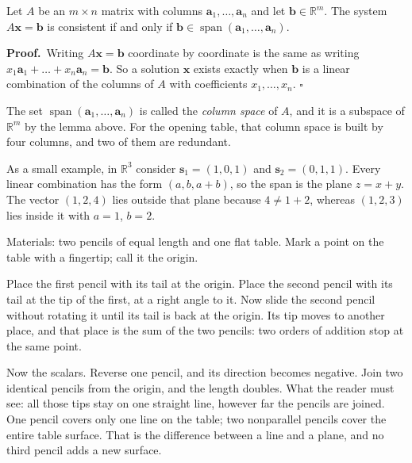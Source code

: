 \begin{proposisi}
Let $A$ be an $m\times n$ matrix with columns $\mathbf{a}_{1},\dots,\mathbf{a}_{n}$ and let
$\mathbf{b}\in\mathbb{R}^{m}$. The system $A\mathbf{x}=\mathbf{b}$ is consistent if and only if
$\mathbf{b}\in\operatorname{span}(\mathbf{a}_{1},\dots,\mathbf{a}_{n})$.
\end{proposisi}

\par\medskip\noindent\textbf{Proof.}\ 
Writing $A\mathbf{x}=\mathbf{b}$ coordinate by coordinate is the same as writing
$x_{1}\mathbf{a}_{1}+\dots+x_{n}\mathbf{a}_{n}=\mathbf{b}$. So a solution $\mathbf{x}$ exists
exactly when $\mathbf{b}$ is a linear combination of the columns of $A$ with coefficients
$x_{1},\dots,x_{n}$.
\hfill$\square$\par\medskip

The set $\operatorname{span}(\mathbf{a}_{1},\dots,\mathbf{a}_{n})$ is called the \emph{column
space} of $A$, and it is a subspace of $\mathbb{R}^{m}$ by the lemma above. For the opening
table, that column space is built by four columns, and two of them are redundant.

As a small example, in $\mathbb{R}^{3}$ consider $\mathbf{s}_{1}=(1,0,1)$ and
$\mathbf{s}_{2}=(0,1,1)$. Every linear combination has the form $(a,b,a+b)$, so the span is the
plane $z=x+y$. The vector $(1,2,4)$ lies outside that plane because $4\neq 1+2$, whereas
$(1,2,3)$ lies inside it with $a=1$, $b=2$.

\begin{tangan}
Materials: two pencils of equal length and one flat table. Mark a point on the table with a
fingertip; call it the origin.

Place the first pencil with its tail at the origin. Place the second pencil with its tail at the
tip of the first, at a right angle to it. Now slide the second pencil without rotating it until
its tail is back at the origin. Its tip moves to another place, and that place is the sum of the
two pencils: two orders of addition stop at the same point.

Now the scalars. Reverse one pencil, and its direction becomes negative. Join two identical
pencils from the origin, and the length doubles. What the reader must see: all those tips stay on
one straight line, however far the pencils are joined. One pencil covers only one line on the
table; two nonparallel pencils cover the entire table surface. That is the difference between a
line and a plane, and no third pencil adds a new surface.
\end{tangan}



